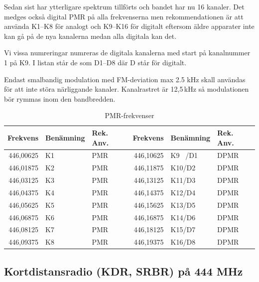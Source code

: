 Sedan sist har ytterligare spektrum tillförts och bandet har nu 16
kanaler. Det medges också digital PMR på alla frekvenserna men
rekommendationen är att använda K1--K8 för analogt och K9--K16 för
digitalt eftersom äldre apparater inte kan gå på de nya kanalerna
medan alla digitala kan det.

Vi vissa numreringar numreras de digitala kanalerna med start på
kanalnummer 1 på K9. I listan står de som D1--D8 där D står för
digitalt.

Endast smalbandig modulation med FM-deviation max 2.5 kHz skall
användas för att inte störa närliggande kanaler. Kanalrastret är
12,5\,kHz så modulationen bör rymmas inom den bandbredden.

\begin{table}[H]
\centering
\begin{tabular}{rll|rll}
	\textbf{Frekvens} & \textbf{Benämning} & \textbf{Rek. Anv.} & \textbf{Frekvens} & \textbf{Benämning} & \textbf{Rek. Anv.} \\ \hline
	        446,00625 & K1                 & PMR                &         446,10625 & K9\ \,\,/D1        & DPMR               \\
	        446,01875 & K2                 & PMR                &         446,11875 & K10/D2             & DPMR               \\
	        446,03125 & K3                 & PMR                &         446,13125 & K11/D3             & DPMR               \\
	        446,04375 & K4                 & PMR                &         446,14375 & K12/D4             & DPMR               \\
	        446,05625 & K5                 & PMR                &         446,15625 & K13/D5             & DPMR               \\
	        446,06875 & K6                 & PMR                &         446,16875 & K14/D6             & DPMR               \\
	        446,08125 & K7                 & PMR                &         446,18125 & K15/D7             & DPMR               \\
	        446,09375 & K8                 & PMR                &         446,19375 & K16/D8             & DPMR
\end{tabular}
\caption{PMR-frekvenser}
\label{tab:pmr-frekvenser}
\end{table}

\subsection{Kortdistansradio (KDR, SRBR) på 444 MHz}
\label{444-MHz}
\label{KDR}
\label{SRBR}

